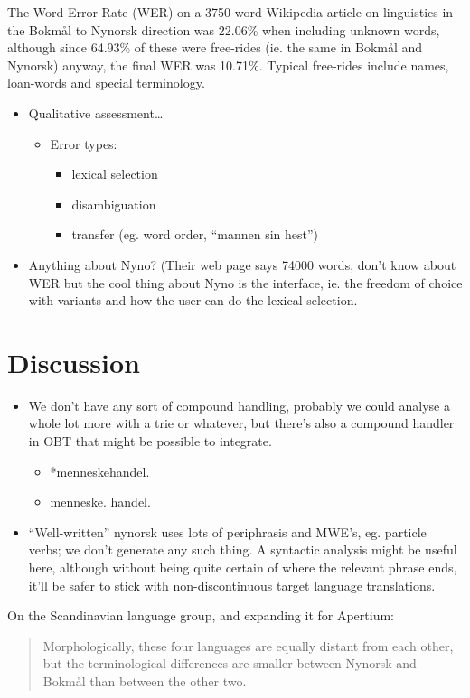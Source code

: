\documentclass[11pt]{article}
\begin{document}
The Word Error Rate (WER) on a 3750 word Wikipedia article on
linguistics in the Bokmål to Nynorsk direction was 22.06\% when
including unknown words, although since 64.93\% of these were
free-rides (ie. the same in Bokmål and Nynorsk) anyway, the final WER
was 10.71\%. Typical free-rides include names, loan-words and special
terminology.

\begin{itemize}
\item Qualitative assessment\ldots{}

\begin{itemize}
\item Error types:

\begin{itemize}
\item lexical selection
\item disambiguation
\item transfer (eg. word order, ``mannen sin hest'')
\end{itemize}

\end{itemize}

\item Anything about Nyno? (Their web page says 74000 words, don't know
  about WER but the cool thing about Nyno is the interface, ie. the
  freedom of choice with variants and how the user can do the lexical
  selection.
\end{itemize}
\section{Discussion}
\label{sec-5}

\begin{itemize}
\item We don't have any sort of compound handling, probably we could
  analyse a whole lot more with a trie or whatever, but there's also a
  compound handler in OBT that might be possible to integrate.

\begin{itemize}
\item *menneskehandel.
\item menneske. handel.
\end{itemize}

\item ``Well-written'' nynorsk uses lots of periphrasis and MWE's, eg. particle
  verbs; we don't generate any such thing. A syntactic analysis might
  be useful here, although without being quite certain of where the
  relevant phrase ends, it'll be safer to stick with non-discontinuous
  target language translations.
\end{itemize}
On the Scandinavian language group, and expanding it for Apertium:
\begin{quote}
Morphologically, these four languages are equally distant from each
other, but the terminological differences are smaller between Nynorsk
and Bokmål than between the other two. \\
\citep{everson2000sln}
\end{quote}
\end{document}
